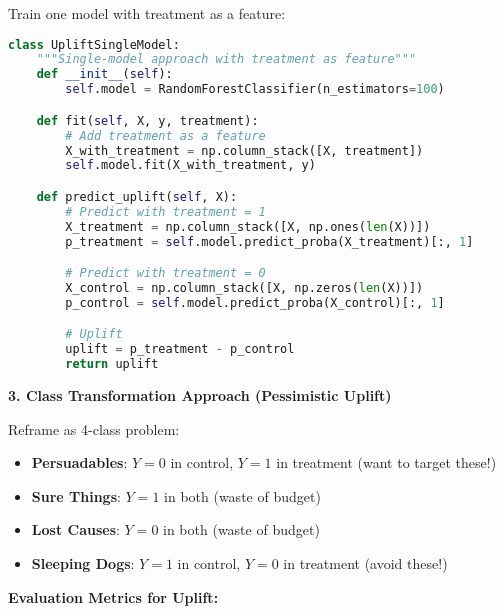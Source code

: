 \documentclass[10pt]{article}
\begin{document}
Train one model with treatment as a feature:
\begin{lstlisting}[language=Python]
class UpliftSingleModel:
    """Single-model approach with treatment as feature"""
    def __init__(self):
        self.model = RandomForestClassifier(n_estimators=100)

    def fit(self, X, y, treatment):
        # Add treatment as a feature
        X_with_treatment = np.column_stack([X, treatment])
        self.model.fit(X_with_treatment, y)

    def predict_uplift(self, X):
        # Predict with treatment = 1
        X_treatment = np.column_stack([X, np.ones(len(X))])
        p_treatment = self.model.predict_proba(X_treatment)[:, 1]

        # Predict with treatment = 0
        X_control = np.column_stack([X, np.zeros(len(X))])
        p_control = self.model.predict_proba(X_control)[:, 1]

        # Uplift
        uplift = p_treatment - p_control
        return uplift
\end{lstlisting}

\textbf{3. Class Transformation Approach (Pessimistic Uplift)}

Reframe as 4-class problem:
\begin{itemize}
\item \textbf{Persuadables}: $Y=0$ in control, $Y=1$ in treatment (want to target these!)
\item \textbf{Sure Things}: $Y=1$ in both (waste of budget)
\item \textbf{Lost Causes}: $Y=0$ in both (waste of budget)
\item \textbf{Sleeping Dogs}: $Y=1$ in control, $Y=0$ in treatment (avoid these!)
\end{itemize}

\textbf{Evaluation Metrics for Uplift:}
\end{document}
